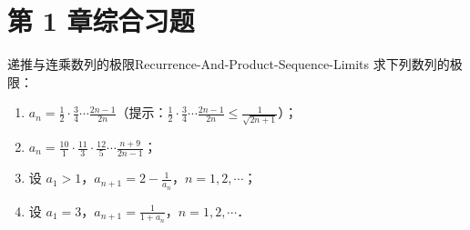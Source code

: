 \section{第 1 章综合习题}

\begin{problem}{递推与连乘数列的极限}{Recurrence-And-Product-Sequence-Limits}
    求下列数列的极限：
    \begin{enumerate}
        \item $a_n = \frac{1}{2} \cdot \frac{3}{4} \cdots \frac{2n-1}{2n}$（提示：$\frac{1}{2} \cdot \frac{3}{4} \cdots \frac{2n-1}{2n} \leqslant \frac{1}{\sqrt{2n+1}}$）；
        \item $a_n = \frac{10}{1} \cdot \frac{11}{3} \cdot \frac{12}{5} \cdots \frac{n+9}{2n-1}$；
        \item 设 $a_1 > 1$，$a_{n+1} = 2 - \frac{1}{a_n}$，$n = 1, 2, \cdots$；
        \item 设 $a_1 = 3$，$a_{n+1} = \frac{1}{1+a_n}$，$n = 1, 2, \cdots$．
    \end{enumerate}
\end{problem}

